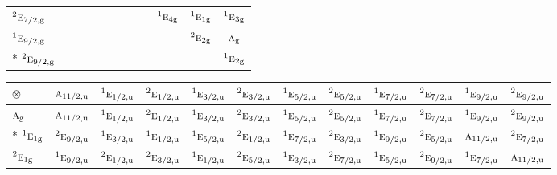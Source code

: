 \documentclass[10pt,a4paper]{article}
\numberwithin{equation}{section}
\newcommand{\irr}[1]{\text{\normalfont\scshape #1}}
\newcommand{\conjpair}[1]{{}^{#1}}
\newcommand{\ptag}[1]{\mathrm{#1}}
\newcommand{\irrprod}{\otimes}
\begin{document}
{\begin{longtable}{@{}lccccccccccc@{}}
$\conjpair{2}\irr{e}_{7/2,\ptag{g}}$ &  &  &  &  &  &  &  &  & $\conjpair{1}\irr{e}_{4\ptag{g}}$ & $\conjpair{1}\irr{e}_{1\ptag{g}}$ & $\conjpair{1}\irr{e}_{3\ptag{g}}$\\
$\conjpair{1}\irr{e}_{9/2,\ptag{g}}$ &  &  &  &  &  &  &  &  &  & $\conjpair{2}\irr{e}_{2\ptag{g}}$ & $\irr{a}_{\ptag{g}}$\\*
$\conjpair{2}\irr{e}_{9/2,\ptag{g}}$ &  &  &  &  &  &  &  &  &  &  & $\conjpair{1}\irr{e}_{2\ptag{g}}$\\
\bottomrule\end{longtable}}
{\small\setlength{\tabcolsep}{3pt}\begin{longtable}{@{}lccccccccccc@{}}\toprule
$\irrprod$ & $\irr{a}_{11/2,\ptag{u}}$ & $\conjpair{1}\irr{e}_{1/2,\ptag{u}}$ & $\conjpair{2}\irr{e}_{1/2,\ptag{u}}$ & $\conjpair{1}\irr{e}_{3/2,\ptag{u}}$ & $\conjpair{2}\irr{e}_{3/2,\ptag{u}}$ & $\conjpair{1}\irr{e}_{5/2,\ptag{u}}$ & $\conjpair{2}\irr{e}_{5/2,\ptag{u}}$ & $\conjpair{1}\irr{e}_{7/2,\ptag{u}}$ & $\conjpair{2}\irr{e}_{7/2,\ptag{u}}$ & $\conjpair{1}\irr{e}_{9/2,\ptag{u}}$ & $\conjpair{2}\irr{e}_{9/2,\ptag{u}}$\\\midrule\endhead
\bottomrule\endfoot\endlastfoot
$\irr{a}_{\ptag{g}}$ & $\irr{a}_{11/2,\ptag{u}}$ & $\conjpair{1}\irr{e}_{1/2,\ptag{u}}$ & $\conjpair{2}\irr{e}_{1/2,\ptag{u}}$ & $\conjpair{1}\irr{e}_{3/2,\ptag{u}}$ & $\conjpair{2}\irr{e}_{3/2,\ptag{u}}$ & $\conjpair{1}\irr{e}_{5/2,\ptag{u}}$ & $\conjpair{2}\irr{e}_{5/2,\ptag{u}}$ & $\conjpair{1}\irr{e}_{7/2,\ptag{u}}$ & $\conjpair{2}\irr{e}_{7/2,\ptag{u}}$ & $\conjpair{1}\irr{e}_{9/2,\ptag{u}}$ & $\conjpair{2}\irr{e}_{9/2,\ptag{u}}$\\*
$\conjpair{1}\irr{e}_{1\ptag{g}}$ & $\conjpair{2}\irr{e}_{9/2,\ptag{u}}$ & $\conjpair{1}\irr{e}_{3/2,\ptag{u}}$ & $\conjpair{1}\irr{e}_{1/2,\ptag{u}}$ & $\conjpair{1}\irr{e}_{5/2,\ptag{u}}$ & $\conjpair{2}\irr{e}_{1/2,\ptag{u}}$ & $\conjpair{1}\irr{e}_{7/2,\ptag{u}}$ & $\conjpair{2}\irr{e}_{3/2,\ptag{u}}$ & $\conjpair{1}\irr{e}_{9/2,\ptag{u}}$ & $\conjpair{2}\irr{e}_{5/2,\ptag{u}}$ & $\irr{a}_{11/2,\ptag{u}}$ & $\conjpair{2}\irr{e}_{7/2,\ptag{u}}$\\
$\conjpair{2}\irr{e}_{1\ptag{g}}$ & $\conjpair{1}\irr{e}_{9/2,\ptag{u}}$ & $\conjpair{2}\irr{e}_{1/2,\ptag{u}}$ & $\conjpair{2}\irr{e}_{3/2,\ptag{u}}$ & $\conjpair{1}\irr{e}_{1/2,\ptag{u}}$ & $\conjpair{2}\irr{e}_{5/2,\ptag{u}}$ & $\conjpair{1}\irr{e}_{3/2,\ptag{u}}$ & $\conjpair{2}\irr{e}_{7/2,\ptag{u}}$ & $\conjpair{1}\irr{e}_{5/2,\ptag{u}}$ & $\conjpair{2}\irr{e}_{9/2,\ptag{u}}$ & $\conjpair{1}\irr{e}_{7/2,\ptag{u}}$ & $\irr{a}_{11/2,\ptag{u}}$\\

\end{longtable}}
\end{document}
